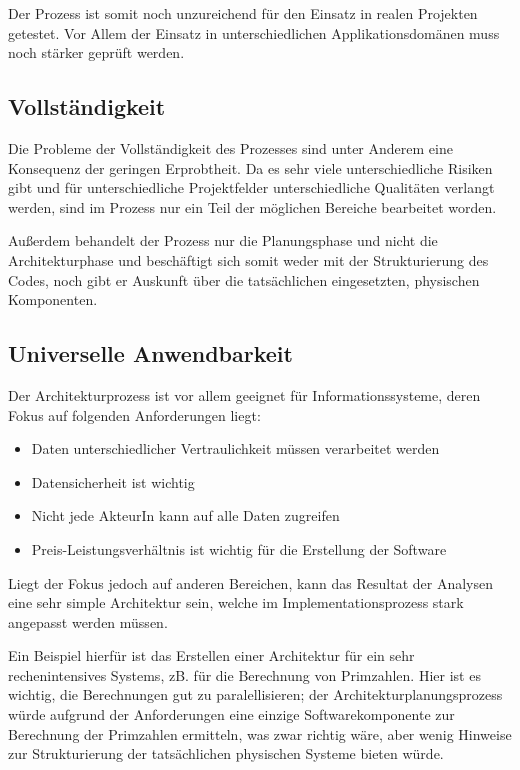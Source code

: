 Der Prozess ist somit noch unzureichend für den Einsatz in realen Projekten getestet. Vor Allem der Einsatz in unterschiedlichen Applikationsdomänen muss noch stärker geprüft werden.

\subsection{Vollständigkeit}
Die Probleme der Vollständigkeit des Prozesses sind unter Anderem eine Konsequenz der geringen Erprobtheit. Da es sehr viele unterschiedliche Risiken gibt und für unterschiedliche Projektfelder unterschiedliche Qualitäten verlangt werden, sind im Prozess nur ein Teil der möglichen Bereiche bearbeitet worden.

Außerdem behandelt der Prozess nur die Planungsphase und nicht die Architekturphase und beschäftigt sich somit weder mit der Strukturierung des Codes, noch gibt er Auskunft über die tatsächlichen eingesetzten, physischen Komponenten.


\subsection{Universelle Anwendbarkeit}
Der Architekturprozess ist vor allem geeignet für Informationssysteme, deren Fokus auf folgenden Anforderungen liegt:

\begin{itemize}
  \item Daten unterschiedlicher Vertraulichkeit müssen verarbeitet werden
  \item Datensicherheit ist wichtig
  \item Nicht jede AkteurIn kann auf alle Daten zugreifen
  \item Preis-Leistungsverhältnis ist wichtig für die Erstellung der Software
\end{itemize}

Liegt der Fokus jedoch auf anderen Bereichen, kann das Resultat der Analysen eine sehr simple Architektur sein, welche im Implementationsprozess stark angepasst werden müssen.

Ein Beispiel hierfür ist das Erstellen einer Architektur für ein sehr rechenintensives Systems, zB. für die Berechnung von Primzahlen. Hier ist es wichtig, die Berechnungen gut zu paralellisieren; der Architekturplanungsprozess würde aufgrund der Anforderungen eine einzige Softwarekomponente zur Berechnung der Primzahlen ermitteln, was zwar richtig wäre, aber wenig Hinweise zur Strukturierung der tatsächlichen physischen Systeme bieten würde.

